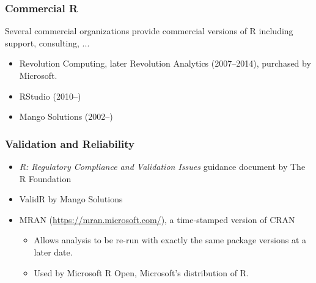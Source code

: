 \documentclass[svgnames]{beamer}
\begin{document}
\begin{frame}
  \frametitle{Commercial R}

  Several commercial organizations provide commercial versions of R
  including support, consulting, ...
  \begin{itemize}
  \item Revolution Computing, later Revolution Analytics (2007--2014),
    purchased by Microsoft.
  \item RStudio (2010--)
  \item Mango Solutions (2002--)
  \end{itemize}

\end{frame}

\begin{frame}
  \frametitle{Validation and Reliability}
  \begin{itemize}
  \item {\em R: Regulatory Compliance and Validation Issues} guidance
    document by The R Foundation
  \item ValidR by Mango Solutions
  \item MRAN (\url{https://mran.microsoft.com/}), a time-stamped version of CRAN
    \begin{itemize}
    \item Allows analysis to be re-run with exactly the same package
      versions at a later date.
    \item Used by Microsoft R Open, Microsoft's distribution of R.
    \end{itemize}
  \end{itemize}
\end{frame}
\end{document}
